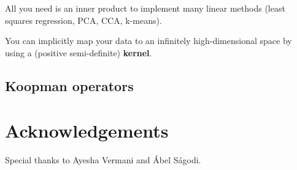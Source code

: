 \documentclass[a4paper,11pt]{exam}
\newcounter{ct}
\begin{document}
\begin{questions}
All you need is an inner product to implement many linear methods (least squares regression, PCA, CCA, k-means).

\begin{tcolorbox}[colback=black!1!,title=Kernel Trick]
You can implicitly map your data to an infinitely high-dimensional space by using a (positive semi-definite) \textbf{kernel}.
\end{tcolorbox}

\subsection{Koopman operators}

\end{questions}

\newpage
\section*{Acknowledgements}
Special thanks to Ayesha Vermani and \'Abel S\'agodi.



\end{document}

